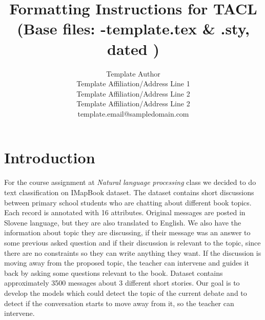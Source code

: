 \documentclass[11pt,a4paper]{article}
\title{Formatting Instructions for TACL \TaclPapers \\
(Base files: \styleFileVersion-template.tex \& \styleFileVersion.sty, dated \dateOfLastUpdate)}
\author{
 Template Author\Thanks{The {\em actual} contributors to this instruction
 document and corresponding template file are given in Section
 \ref{sec:contributors}.} \\
 Template Affiliation/Address Line 1 \\
 Template Affiliation/Address Line 2 \\
 Template Affiliation/Address Line 2 \\
  {\sf template.email@sampledomain.com} \\
}
\date{}
\newcommand{\taclpaper}{final version\xspace}
\newcommand{\taclpapers}{final versions\xspace}
\newcommand{\taclpaper}{submission\xspace}
\newcommand{\taclpapers}{{\taclpaper}s\xspace}
\begin{document}
\maketitle


\section{Introduction}
For the course assignment at \textit{Natural language processing} class we decided to do text classification on IMapBook dataset.
The dataset contains short discussions between primary school students who are chatting about different book topics.
Each record is annotated with 16 attributes.
Original messages are posted in Slovene language, but they are also translated to English.
We also have the information about topic they are discussing, if their message was an answer to some previous asked question and if their discussion is relevant to the topic, since there are no constraints so they can write anything they want.
If the discussion is moving away from the proposed topic, the teacher can intervene and guides it back by asking some questions relevant to the book.
Dataset contains approximately 3500 messages about 3 different short stories.
Our goal is to develop the models which could detect the topic of the current debate and to detect if the conversation starts to move away from it, so the teacher can intervene.

\end{document}
